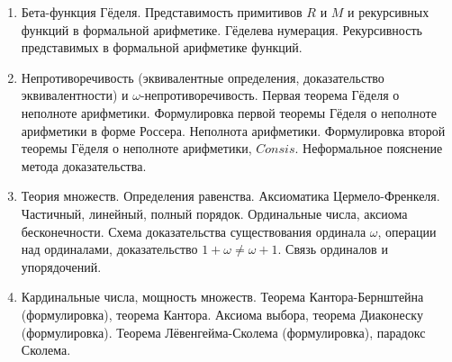 \documentclass[11pt,a4paper,oneside]{scrartcl}
\begin{document}
\begin{enumerate}
\item Бета-функция Гёделя. Представимость примитивов $R$ и $M$ и рекурсивных функций в формальной арифметике.
Гёделева нумерация. Рекурсивность представимых в формальной арифметике функций.
\item Непротиворечивость (эквивалентные определения, доказательство эквивалентности) и $\omega$-не\-про\-ти\-во\-речивость. 
Первая теорема Гёделя о неполноте арифметики.
Формулировка первой теоремы Гёделя о неполноте арифметики в форме Россера. Неполнота арифметики.
Формулировка второй теоремы Гёделя о неполноте арифметики, $Consis$. 
Неформальное пояснение метода доказательства.
\item Теория множеств. Определения равенства. Аксиоматика Цермело-Френкеля. Частичный, линейный, полный порядок.
Ординальные числа, аксиома бесконечности. Схема доказательства существования ординала $\omega$, 
операции над ординалами, доказательство $1+\omega\ne\omega+1$. Связь ординалов и упорядочений.
\item Кардинальные числа, мощность множеств. Теорема Кантора-Бернштейна (формулировка), теорема Кантора. 
Аксиома выбора, теорема Диаконеску (формулировка). Теорема Лёвенгейма-Сколема (формулировка), парадокс Сколема.

\end{enumerate}
\end{document}
